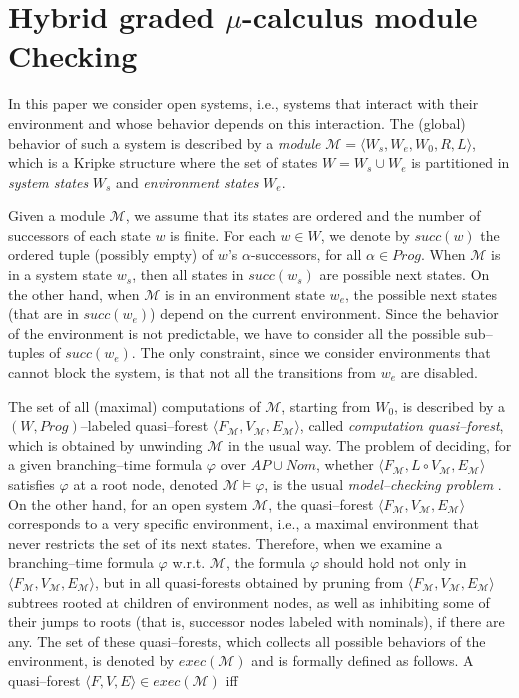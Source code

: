 \documentclass{LMCS}
\theoremstyle{plain}
\def \edge          {E}
\def \M             {\mathcal{M}}
\def \node          {V}
\newcommand \tpl[1] {\langle #1 \rangle}
\begin{document}
\section{Hybrid graded $\mu$-calculus module Checking}\label{sec:HybridGradedModuleChecking}
In this paper we consider open systems, i.e., systems that
interact with their environment and whose behavior depends on this
interaction. The (global) behavior of such a system is described
by a \emph{module} $\M = \tpl{W_s,W_e,W_0,R,L}$, which is a Kripke
structure where the set of states $W = W_s \cup W_e$ is
partitioned in \emph{system states} $W_s$ and \emph{environment
states} $W_e$.

Given a module $\M$, we assume that its states are ordered and the
number of successors of each state $w$ is finite. For each $w \in
W$, we denote by $succ(w)$ the ordered tuple (possibly empty) of
$w$'s $\alpha$-successors, for all $\alpha \in Prog$. When $\M$ is
in a system state $w_s$, then all states in $succ(w_s)$ are
possible next states. On the other hand, when $\M$ is in an
environment state $w_e$, the possible next states (that are in
$succ(w_e)$) depend on the current environment. Since the behavior
of the environment is not predictable, we have to consider all the
possible sub--tuples of $succ(w_e)$. The only constraint, since we
consider environments that cannot block the system, is that not
all the transitions from $w_e$ are disabled.

The set of all (maximal) computations of $\M$, starting from
$W_0$, is described by a $(W,Prog)$--labeled quasi--forest
$\tpl{F_{\M},\node_{\M},\edge_{\M}}$, called \emph{computation
quasi--forest}, which is obtained by unwinding $\M$ in the usual
way. The problem of deciding, for a given branching--time formula
$\varphi$ over $AP\cup Nom$, whether $\tpl{F_{\M}, L \circ
\node_{\M},\edge_{\M}}$ satisfies $\varphi$ at a root node,
denoted $\M \models \varphi$, is the usual \emph{model--checking
problem} \cite{CE81,QS81}. On the other hand, for an open system
$\M$, the quasi--forest $\tpl{F_{\M}, \node_{\M},\edge_{\M}}$
corresponds to a very specific environment, i.e., a maximal
environment that never restricts the set of its next states.
Therefore, when we examine a branching--time formula $\varphi$
w.r.t. $\M$, the formula $\varphi$ should hold not only in
$\tpl{F_{\M},\node_{\M},\edge_{\M}}$, but in all quasi-forests
obtained by pruning from $\tpl{F_{\M},\node_{\M},\edge_{\M}}$
subtrees rooted at children of environment nodes, as well as
inhibiting some of their jumps to roots (that is, successor nodes
labeled with nominals), if there are any. The set of these
quasi--forests, which collects all possible behaviors of the
environment, is denoted by $exec(\M)$ and is formally defined as
follows. A quasi--forest $\tpl{F,\node,\edge} \in exec(\M)$ iff
\end{document}
